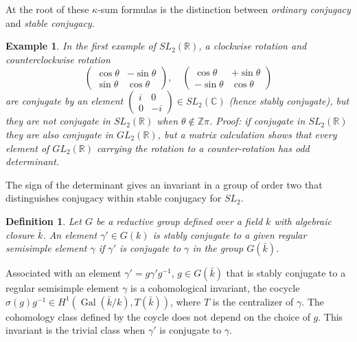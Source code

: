 \documentclass[brochure,english,12pt]{bourbaki}
\newtheorem{example}[equation]{Example}
\newtheorem{definition}[equation]{Definition}
\def\op#1{{\operatorname{#1}}}
\newcommand{\ring}[1]{\mathbb{#1}}
\begin{document}
At the root of these $\kappa$-sum formulas is the distinction between
{\it ordinary conjugacy} and {\it stable conjugacy}.  
\begin{example}
In the first example of $SL_2(\ring{R})$,
a clockwise rotation and counterclockwise rotation
\[
\begin{pmatrix}\cos\theta &-\sin\theta\\\sin\theta &\cos\theta\end{pmatrix},\quad
\begin{pmatrix}\cos\theta &+\sin\theta\\-\sin\theta &\cos\theta\end{pmatrix}
\]
are conjugate by an element $\begin{pmatrix}i&0\\0&-i\end{pmatrix}\in
SL_2(\ring{C})$ (hence stably conjugate), but they are not conjugate
in $SL_2(\ring{R})$ when $\theta\not\in\ring{Z}\pi$.  Proof: if conjugate in $SL_2(\ring{R})$ they are
also conjugate in $GL_2(\ring{R})$, but a matrix calculation shows
that every element of $GL_2(\ring{R})$ carrying the rotation to a
counter-rotation has odd determinant.  
\end{example}
The sign of the determinant gives an
invariant in a group of order two that distinguishes conjugacy within
stable conjugacy for $SL_2$.

\begin{definition} Let $G$ be a reductive group defined over a field
  $k$ with algebraic closure $\bar k$.  An element
  $\gamma'\in G(k)$ is {\it stably conjugate} to a given regular
  semisimple element $\gamma$ if $\gamma'$ is conjugate to $\gamma$ in
  the group $G(\bar k)$.
\end{definition}

Associated with an element $\gamma'=g\gamma' g^{-1}$, $g\in G(\bar k)$
that is stably conjugate to a regular semisimple element $\gamma$ is a
cohomological invariant, the cocycle $\sigma(g)g^{-1}\in
H^1(\op{Gal}(\bar k/k),T(\bar k))$, where $T$ is the centralizer of
$\gamma$.  The cohomology class defined by the coycle does not depend
on the choice of $g$.  This invariant is the trivial class when
$\gamma'$ is conjugate to $\gamma$.

\end{document}
